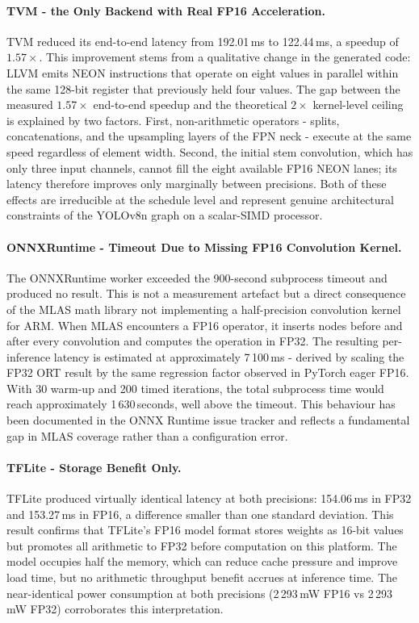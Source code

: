\documentclass[12pt,a4paper]{report}
\begin{document}
\paragraph{TVM - the Only Backend with Real FP16 Acceleration.}
TVM reduced its end-to-end latency from 192.01\,ms to 122.44\,ms, a speedup
of $1.57\times$. This improvement stems from a qualitative change in the
generated code: LLVM emits  NEON instructions that operate on
eight  values in parallel within the same 128-bit register that
previously held four  values. The gap between the measured
$1.57\times$ end-to-end speedup and the theoretical $2\times$ kernel-level
ceiling is explained by two factors. First, non-arithmetic operators - splits,
concatenations, and the upsampling layers of the FPN neck - execute at the
same speed regardless of element width. Second, the initial stem convolution,
which has only three input channels, cannot fill the eight available FP16 NEON
lanes; its latency therefore improves only marginally between precisions.
Both of these effects are irreducible at the schedule level and represent
genuine architectural constraints of the YOLOv8n graph on a scalar-SIMD
processor.

\paragraph{ONNXRuntime - Timeout Due to Missing FP16 Convolution Kernel.}
The ONNXRuntime worker exceeded the 900-second subprocess timeout and produced
no result. This is not a measurement artefact but a direct consequence of the
MLAS math library not implementing a half-precision convolution kernel for ARM.
When MLAS encounters a FP16  operator, it inserts
 nodes before and after every convolution and
computes the operation in FP32. The resulting per-inference latency is estimated
at approximately 7\,100\,ms - derived by scaling the FP32 ORT result by the
same regression factor observed in PyTorch eager FP16. With 30 warm-up and 200
timed iterations, the total subprocess time would reach approximately
1\,630\,seconds, well above the timeout. This behaviour has been documented in
the ONNX Runtime issue tracker
and reflects a fundamental gap in MLAS coverage rather than a configuration
error.

\paragraph{TFLite - Storage Benefit Only.}
TFLite produced virtually identical latency at both precisions: 154.06\,ms in
FP32 and 153.27\,ms in FP16, a difference smaller than one standard deviation.
This result confirms that TFLite's FP16 model format stores weights as 16-bit
values but promotes all arithmetic to FP32 before computation on this platform.
The model occupies half the memory, which can reduce cache pressure and improve
load time, but no arithmetic throughput benefit accrues at inference time. The
near-identical power consumption at both precisions (2\,293\,mW FP16 vs
2\,293\,mW FP32) corroborates this interpretation.
\end{document}
